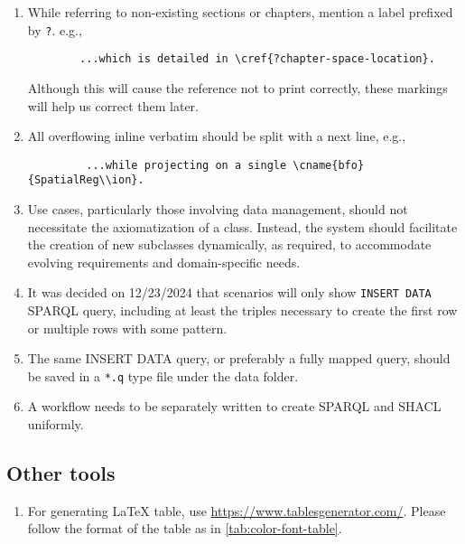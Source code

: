 \begin{enumerate}
    \item While referring to non-existing sections or chapters, mention a label prefixed by \texttt{?}. e.g.,
    \begin{verbatim}
        ...which is detailed in \cref{?chapter-space-location}. 
    \end{verbatim}
    Although this will cause the reference not to print correctly, these markings will help us correct them later. 
    
    \item All overflowing inline verbatim should be split with a next line, e.g.,
    \begin{verbatim}
         ...while projecting on a single \cname{bfo}{SpatialReg\\ion}.
    \end{verbatim}

    \item  Use cases, particularly those involving data management, should not necessitate the axiomatization of a class. Instead, the system should facilitate the creation of new subclasses dynamically, as required, to accommodate evolving requirements and domain-specific needs.

    \item It was decided on 12/23/2024 that scenarios will only show \texttt{INSERT DATA} SPARQL query, including at least the triples necessary to create the first row or multiple rows with some pattern. 

        \item The same INSERT DATA query, or preferably a fully mapped query, should be saved in a \texttt{*.q} type file under the data folder.

    \item A workflow needs to be separately written to create SPARQL and SHACL uniformly.     
 \end{enumerate}

\subsection*{Other tools}
\begin{enumerate}
    \item For generating \LaTeX\xspace table, use \href{Table Genrator}{https://www.tablesgenerator.com/}. Please follow the format of the table as in \cref{tab:color-font-table}.
\end{enumerate}
